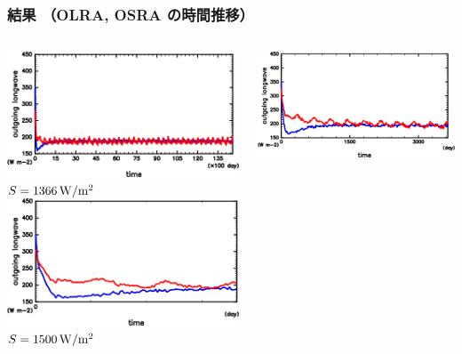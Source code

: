 \documentclass[aspectratio=149,9pt,fleqn]{beamer}
\begin{document}
\begin{frame}
	\frametitle{結果 （OLRA, OSRA の時間推移）}
	\begin{columns}[T]
		\begin{column}{.3\textwidth}
			\centering
			\includegraphics[width=\textwidth]{S1366/S1300_OLRA-OSRA_horimean_time0.0-14600.0-crop.png}
			\(S=1366\hmu{W/m^2}\)\\
			\includegraphics[width=\textwidth]{S1500/S1500_OLRA-OSRA_horimean_time0.0-1095.0-crop.png}
			\(S=1500\hmu{W/m^2}\)
		\end{column}
		\begin{column}{.3\textwidth}
			\centering
			\includegraphics[width=\textwidth]{S1600/S1600_OLRA-OSRA_horimean_time0.0-3650.0-crop.png}

\end{column}
\end{columns}
\end{frame}
\end{document}
